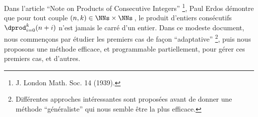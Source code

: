 Dans l'article \enquote{Note on Products of Consecutive Integers}
\footnote{
	J. London Math. Soc. 14 (1939).
},
Paul Erdos démontre que pour tout couple $(n, k) \in \NNs \times \NNs$\,, le produit d'entiers consécutifs $\dprod_{i = 0}^{k} (n + i)$ n'est jamais le carré d'un entier. Dans ce modeste document, nous commençons par étudier les premiers cas de façon \enquote{adaptative}
\footnote{
	Différentes approches intéressantes sont proposées avant de donner une méthode \enquote{généraliste} qui nous semble être la plus efficace.
},
puis nous proposons une méthode efficace, et programmable partiellement, pour gérer ces premiers cas, et d'autres. 